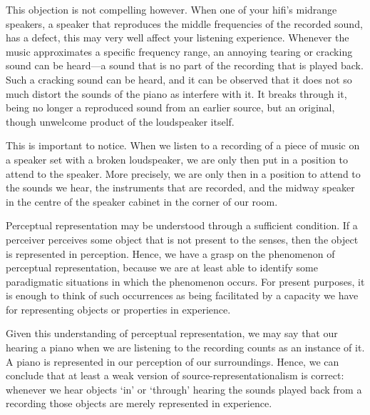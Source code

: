 \documentclass[sloppy, journal, git, bytitle, dodraft]{humapap}
\begin{document}
This objection is not compelling however. When one of your hifi's midrange speakers, a speaker that reproduces the middle frequencies of the recorded sound, has a defect, this may very well affect your listening experience. Whenever the music approximates a specific frequency range, an annoying tearing or cracking sound can be heard---a sound that is no part of the recording that is played back. Such a cracking sound can be heard, and it can be observed that it does not so much distort the sounds of the piano as interfere with it. It breaks through it, being no longer a reproduced sound from an earlier source, but an original, though unwelcome product of the loudspeaker itself. 

This is important to notice. When we listen to a recording of a piece of music on a speaker set with a broken loudspeaker, we are only then put in a position to attend to the speaker. More precisely, we are only then in a position to attend to the sounds we hear, the instruments that are recorded, and the midway speaker in the centre of the speaker cabinet in the corner of our room. 


\sect Perceptual representation may be understood through a sufficient condition. If a perceiver perceives some object that is not present to the senses, then the object is represented in perception. Hence, we have a grasp on the phenomenon of perceptual representation, because we are at least able to identify some paradigmatic situations in which the phenomenon occurs. For present purposes, it is enough to think of such occurrences as being facilitated by a capacity we have for representing objects or properties in experience. 

Given this understanding of perceptual representation, we may say that our hearing a piano when we are listening to the recording counts as an instance of it. A piano is represented in our perception of our surroundings. Hence, we can conclude that at least a weak version of source-representationalism is correct: whenever we hear objects `in' or `through' hearing the sounds played back from a recording those objects are merely represented in experience. 
\end{document}

